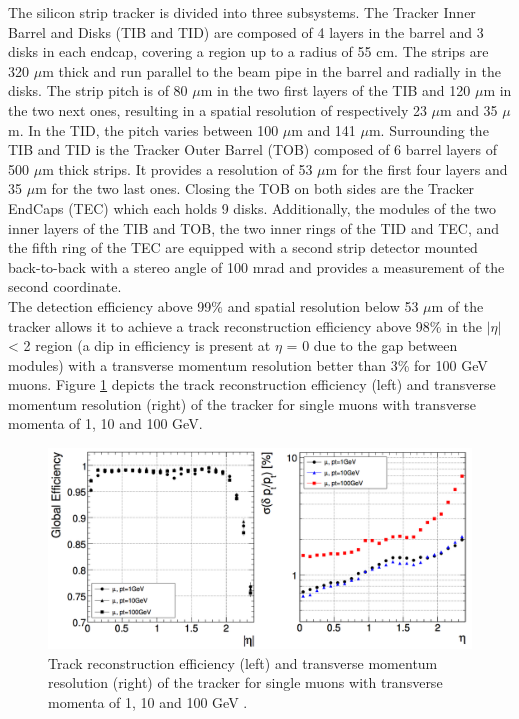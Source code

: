     The silicon strip tracker is divided into three subsystems. The Tracker Inner Barrel and Disks (TIB and TID) are composed of 4 layers in the barrel and 3 disks in each endcap, covering a region up to a radius of 55 cm. The strips are 320 $\mu$m thick and run parallel to the beam pipe in the barrel and radially in the disks. The strip pitch is of 80 $\mu$m in the two first layers of the TIB and 120 $\mu$m in the two next ones, resulting in a spatial resolution of respectively 23 $\mu$m and 35 $\mu$m. In the TID, the pitch varies between 100 $\mu$m and 141 $\mu$m. Surrounding the TIB and TID is the Tracker Outer Barrel (TOB) composed of 6 barrel layers of 500 $\mu$m thick strips. It provides a resolution of 53 $\mu$m for the first four layers and 35 $\mu$m for the two last ones. Closing the TOB on both sides are the Tracker EndCaps (TEC) which each holds 9 disks. Additionally, the modules of the two inner layers of the TIB and TOB, the two inner rings of the TID and TEC, and the fifth ring of the TEC are equipped with a second strip detector mounted back-to-back with a stereo angle of 100 mrad and provides a measurement of the second coordinate. \\

    The detection efficiency above 99\% and spatial resolution below 53 $\mu$m of the tracker allows it to achieve a track reconstruction efficiency above 98\% in the $|\eta|$ < 2 region (a dip in efficiency is present at $\eta$ = 0 due to the gap between modules) with a transverse momentum resolution better than 3\% for 100 GeV muons. Figure \ref{fig:I-3-tracker-eff} depicts the track reconstruction efficiency (left) and transverse momentum resolution (right) of the tracker for single muons with transverse momenta of 1, 10 and 100 GeV. \\

    \begin{figure}[h!]
      \centering
      \includegraphics[width=\textwidth]{img/I-3-cms/tracker_efficiency.png}
      \caption{Track reconstruction efficiency (left) and transverse momentum resolution (right) of the tracker for single muons with transverse momenta of 1, 10 and 100 GeV \cite{1748-0221-3-08-S08004}.}
      \label{fig:I-3-tracker-eff}
    \end{figure}

